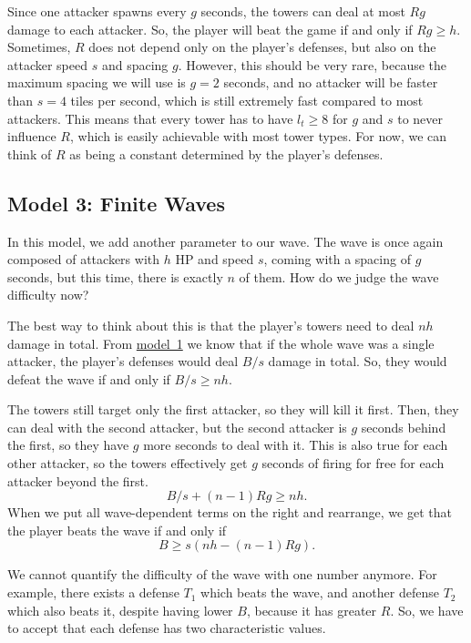 Since one attacker spawns every $g$ seconds, the towers can deal at most $Rg$ damage to each attacker.
So, the player will beat the game if and only if $Rg \geq h$.
Sometimes, $R$ does not depend only on the player's defenses, but also on the attacker speed $s$ and spacing $g$.
However, this should be very rare, because the maximum spacing we will use is $g=2$ seconds, and no attacker will be faster than $s=4$ tiles per second, which is still extremely fast compared to most attackers.
This means that every tower has to have $l_t \geq 8$ for $g$ and $s$ to never influence $R$, which is easily achievable with most tower types.
For now, we can think of $R$ as being a constant determined by the player's defenses.

\subsection{Model 3: Finite Waves}\label{sec:analysis-waves-finite}
In this model, we add another parameter to our wave.
The wave is once again composed of attackers with $h$ HP and speed $s$, coming with a spacing of $g$ seconds, but this time, there is exactly $n$ of them.
How do we judge the wave difficulty now?

The best way to think about this is that the player's towers need to deal $nh$ damage in total.
From \hyperref[sec:analysis-waves-single]{model~1} we know that if the whole wave was a single attacker, the player's defenses would deal $B/s$ damage in total.
So, they would defeat the wave if and only if $B/s \geq nh$.

The towers still target only the first attacker, so they will kill it first.
Then, they can deal with the second attacker, but the second attacker is $g$ seconds behind the first, so they have $g$ more seconds to deal with it.
This is also true for each other attacker, so the towers effectively get $g$ seconds of firing for free for each attacker beyond the first.
\begin{equation*}
    B/s + (n-1) R g \geq nh.
\end{equation*}
When we put all wave-dependent terms on the right and rearrange, we get that the player beats the wave if and only if
\begin{equation}\label{eqn:beat-finite-wave}
    B \geq s(nh - (n - 1)Rg).
\end{equation}

We cannot quantify the difficulty of the wave with one number anymore.
For example, there exists a defense $T_1$ which beats the wave, and another defense $T_2$ which also beats it, despite having lower $B$, because it has greater $R$.
So, we have to accept that each defense has two characteristic values.

